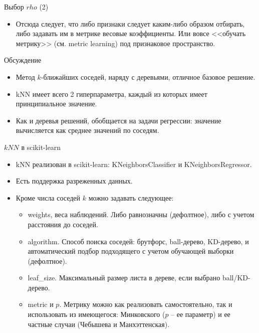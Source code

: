 \documentclass{beamer}
\begin{document}
\begin{frame}{Выбор $rho$ (2)}
    \small
    \begin{itemize}
        \item Отсюда следует, что либо признаки следует каким-либо образом отбирать, либо задавать им в метрике весовые коэффициенты. Или вовсе <<обучать метрику>> (см. metric learning) под признаковое пространство.
    \end{itemize}
\end{frame}

\begin{frame}{Обсуждение}
    \small

    \begin{itemize}
        \item Метод $k$-ближайших соседей, наряду с деревьями, отличное базовое решение.
        \item kNN имеет всего 2 гиперпараметра, каждый из которых имеет принципиальное значение.
        \item Как и деревья решений, обобщается на задачи регрессии: значение вычисляется как среднее значений по соседям.
    \end{itemize}
\end{frame}

\begin{frame}{$kNN$ в scikit-learn}
    \small

    \begin{itemize}
        \item kNN реализован в scikit-learn: KNeighborsClassifier и KNeighborsRegressor. \item Есть поддержка разреженных данных. 
        \item Кроме числа соседей $k$ можно задавать следующее:
        \begin{itemize}
            \item weights, веса наблюдений. Либо равнозначны (дефолтное), либо с учетом расстояния до соседей.
            \item algorithm. Способ поиска соседей: брутфорс, ball-дерево, KD-дерево, и автоматический подбор подходящего с учетом обучающей выборки (дефолтное).
            \item leaf\_size. Максимальный размер листа в дереве, если выбрано ball/KD-дерево.
            \item metric и $p$. Метрику можно как реализовать самостоятельно, так и использовать из имеющегося: Минковского ($p$ -- ее параметр) и ее частные случаи (Чебышева и Манхэттенская).
        \end{itemize}
    \end{itemize}
\end{frame}
\end{document}
